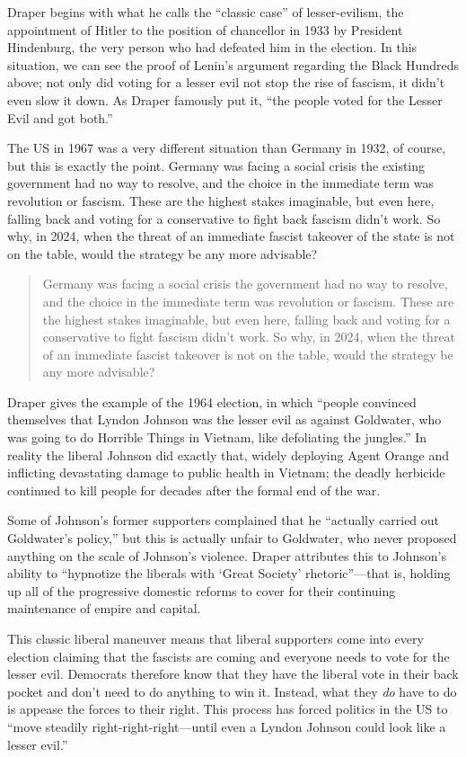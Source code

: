 Draper begins with what he calls the ``classic case'' of lesser-evilism, the appointment of Hitler to the position of chancellor in 1933 by President Hindenburg, the very person who had defeated him in the election. In this situation, we can see the proof of Lenin's argument regarding the Black Hundreds above; not only did voting for a lesser evil not stop the rise of fascism, it didn't even slow it down. As Draper famously put it, ``the people voted for the Lesser Evil and got both.''

The US in 1967 was a very different situation than Germany in 1932, of course, but this is exactly the point. Germany was facing a social crisis the existing government had no way to resolve, and the choice in the immediate term was revolution or fascism. These are the highest stakes imaginable, but even here, falling back and voting for a conservative to fight back fascism didn't work. So why, in 2024, when the threat of an immediate fascist takeover of the state is not on the table, would the strategy be any more advisable?

\blockquote{Germany was facing a social crisis the government had no way to resolve, and the choice in the immediate term was revolution or fascism. These are the highest stakes imaginable, but even here, falling back and voting for a conservative to fight fascism didn't work. So why, in 2024, when the threat of an immediate fascist takeover is not on the table, would the strategy be any more advisable?}

Draper gives the example of the 1964 election, in which ``people convinced themselves that Lyndon Johnson was the lesser evil as against Goldwater, who was going to do Horrible Things in Vietnam, like defoliating the jungles.'' In reality the liberal Johnson did exactly that, widely deploying Agent Orange and inflicting devastating damage to public health in Vietnam; the deadly herbicide continued to kill people for decades after the formal end of the war.

Some of Johnson's former supporters complained that he ``actually carried out Goldwater's policy,'' but this is actually unfair to Goldwater, who never proposed anything on the scale of Johnson's violence. Draper attributes this to Johnson's ability to ``hypnotize the liberals with `Great Society' rhetoric''---that is, holding up all of the progressive domestic reforms to cover for their continuing maintenance of empire and capital.

This classic liberal maneuver means that liberal supporters come into every election claiming that the fascists are coming and everyone needs to vote for the lesser evil. Democrats therefore know that they have the liberal vote in their back pocket and don't need to do anything to win it. Instead, what they \emph{do} have to do is appease the forces to their right. This process has forced politics in the US to ``move steadily right-right-right---until even a Lyndon Johnson could look like a lesser evil.''

